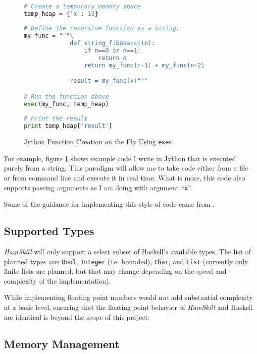 \documentclass{report}
\begin{document}
\begin{figure}[H]\label{fig:stringBasedRecursion}
\begin{mdframed}
\begin{lstlisting}[language=Python]

# Create a temporary memory space
temp_heap = {'x': 10}
    
# Define the recursive function as a string.
my_func = """\
             def string_fibonacci(n):
                 if n==0 or n==1:
                     return n
                 return my_func(n-1) + my_func(n-2)

             result = my_func(x)"""    

# Run the function above
exec(my_func, temp_heap)
    
# Print the result
print temp_heap['result']

\end{lstlisting}
\end{mdframed}
\caption{Jython Function Creation on the Fly Using {\tt exec}}
\end{figure}

For example, figure \ref{fig:stringBasedRecursion} shows example code I write in Jython that is executed purely from a string.  This paradigm will allow me to take code either from a file or from command line and execute it in real time.  What is more, this code also supports passing arguments as I am doing with argument ``{\tt x}''.

Some of the guidance for implementing this style of code came from \cite{stackOverflowExecRecursive}.

\subsection{Supported Types}

\emph{HamSkill} will only support a select subset of Haskell's available types.  The list of planned types are: {\tt Bool}, {\tt Integer} (i.e. bounded), {\tt Char}, and {\tt List} (currently only finite lists are planned, but that may change depending on the speed and complexity of the implementation).

While implementing floating point numbers would not add substantial complexity at a basic level, ensuring that the floating point behavior of \emph{HamSkill} and Haskell are identical is beyond the scope of this project.

\subsection{Memory Management}
\end{document}
